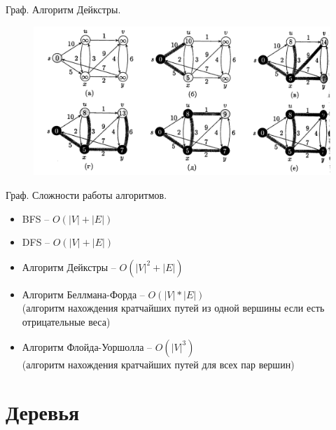 \documentclass[10pt]{beamer}
\begin{document}
\begin{frame}{Граф. Алгоритм Дейкстры.}
\begin{figure}
\centerline{\includegraphics[width=1.0\linewidth]{images/deicstra_graphs.png}}
\end{figure}
\end{frame}



\begin{frame}{Граф. Сложности работы алгоритмов.}
\begin{itemize}
\item BFS -- $O(|V| + |E|)$
\item DFS -- $O(|V| + |E|)$
\item Алгоритм Дейкстры -- $O(|V|^2 + |E|)$
\item Алгоритм Беллмана-Форда -- $O(|V|*|E|)$ \\
(алгоритм нахождения кратчайших путей из одной вершины если есть отрицательные веса)
\item Алгоритм Флойда-Уоршолла -- $O(|V|^3)$ \\
(алгоритм нахождения кратчайших путей для всех пар вершин)
\end{itemize}
\end{frame}


\section{Деревья}
\end{document}

